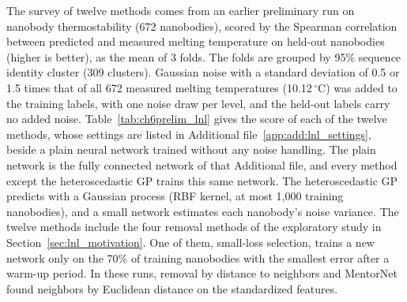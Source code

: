The survey of twelve methods comes from an earlier preliminary run on nanobody thermostability (672 nanobodies), scored by the Spearman correlation between predicted and measured melting temperature on held-out nanobodies (higher is better), as the mean of 3 folds. The folds are grouped by 95\% sequence identity cluster (309 clusters). Gaussian noise with a standard deviation of 0.5 or 1.5 times that of all 672 measured melting temperatures (10.12\,$^\circ$C) was added to the training labels, with one noise draw per level, and the held-out labels carry no added noise. Table~\ref{tab:ch6prelim_lnl} gives the score of each of the twelve methods, whose settings are listed in Additional file~\ref{app:add:lnl_settings}, beside a plain neural network trained without any noise handling. The plain network is the fully connected network of that Additional file, and every method except the heteroscedastic GP trains this same network. The heteroscedastic GP predicts with a Gaussian process (RBF kernel, at most 1,000 training nanobodies), and a small network estimates each nanobody's noise variance. The twelve methods include the four removal methods of the exploratory study in Section~\ref{sec:lnl_motivation}. One of them, small-loss selection, trains a new network only on the 70\% of training nanobodies with the smallest error after a warm-up period. In these runs, removal by distance to neighbors and MentorNet found neighbors by Euclidean distance on the standardized features.

